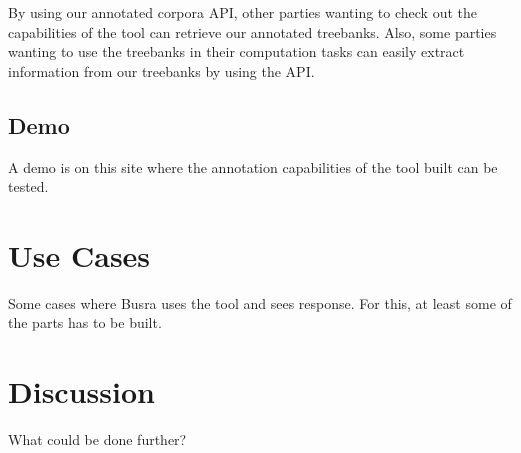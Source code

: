 \documentclass[
]{ceurart}
\begin{document}
By using our annotated corpora API, other parties wanting to check out the capabilities of the tool can retrieve our annotated treebanks. Also, some parties wanting to use the treebanks in their computation tasks can easily extract information from our treebanks by using the API.

\subsection{Demo}

A demo is on this site where the annotation capabilities of the tool built can be tested.

\section{Use Cases}

Some cases where Busra uses the tool and sees response. For this, at least some of the parts has to be built.

\section{Discussion}

What could be done further?


\end{document}
